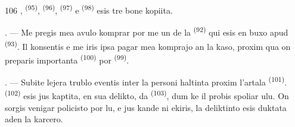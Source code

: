 \begin{VUpage}[108]{106}
\VUcontinue
{},  \textsuperscript{(95)},  \textsuperscript{(96)},  \textsuperscript{(97)} e \cc
{} \textsuperscript{(98)} esis tre bone kopiita.

\VUsaut{4.4mm}
\VUsaut{2.8mm}

. --- Me pregis mea avulo komprar por me\nl
un de la  \textsuperscript{(92)} qui esis en buxo\nl
apud  \textsuperscript{(93)}. Il konsentis e me iris ipsa\nl
pagar mea komprajo an la kaso, proxim qua\nl
on preparis importanta  \textsuperscript{(100)} por\nl
{} \textsuperscript{(99)}.

. --- Subite lejera trublo eventis inter la\nl
personi haltinta proxim l'artala  \textsuperscript{(101)}.\nl
{} \textsuperscript{(102)} esis jus kaptita, en sua delikto,\nl
da  \textsuperscript{(103)}, dum ke il probis spoliar\nl
ulu. On sorgis venigar policisto por  lu,\nl
e jus kande ni ekiris, la deliktinto esis duktata\nl
aden la karcero.

\VUsaut{6.0mm}
\VUfilet{22mm}
\end{VUpage}
